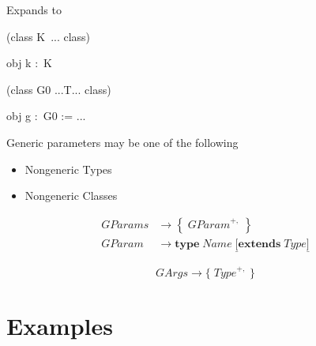 \documentclass{article}%
\begin{document}
Expands to

\begin{code}
(class K\ ... class)

obj k :\ K

(class G0 ...T... class)

obj g :\ G0 := ...
\end{code}

Generic parameters may be one of the following

\begin{itemize}
\item Nongeneric Types

\item Nongeneric Classes
\end{itemize}

%

\begin{align*}
\mathit{GParams}  &  \rightarrow\left\{  \;\mathit{GParam}^{+,}\;\right\} \\
\mathit{GParam}  &  \rightarrow\mathbf{type}\;\mathit{Name}\;\underline{[}%
\mathbf{extends}\;\mathit{Type}\underline{]}%
\end{align*}
%

\[
\mathit{GArgs}\rightarrow\{\;\mathit{Type}^{+,}\;\}
\]


\section{Examples}
\end{document}
